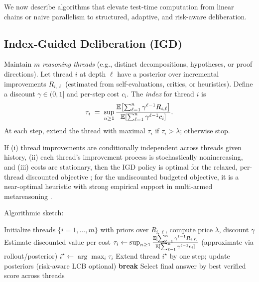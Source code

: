 We now describe algorithms that elevate test-time computation from linear chains or naive parallelism to structured, adaptive, and risk-aware deliberation.

\subsection{Index-Guided Deliberation (IGD)}

Maintain $m$ \emph{reasoning threads} (e.g., distinct decompositions, hypotheses, or proof directions). Let thread $i$ at depth $\ell$ have a posterior over incremental improvements $R_{i,\ell}$ (estimated from self-evaluations, critics, or heuristics). Define a discount $\gamma \in (0,1]$ and per-step cost $c_i$.
The \emph{index} for thread $i$ is
\begin{equation}
\tau_i \;=\; \sup_{n \ge 1} \frac{\mathbb{E}\!\left[ \sum_{\ell=1}^n \gamma^{\ell-1} R_{i,\ell} \right]}{\mathbb{E}\!\left[ \sum_{\ell=1}^n \gamma^{\ell-1} c_i \right]}.
\label{eq:gittins}
\end{equation}
At each step, extend the thread with maximal $\tau_i$ if $\tau_i > \lambda$; otherwise stop. 

\begin{proposition}
If (i) thread improvements are conditionally independent across threads given history, (ii) each thread's improvement process is stochastically nonincreasing, and (iii) costs are stationary, then the IGD policy is optimal for the relaxed, per-thread discounted objective \cite{gittins1979,whittle1988restless}; for the undiscounted budgeted objective, it is a near-optimal heuristic with strong empirical support in multi-armed metareasoning \cite{russellwefald1991,liedergriffiths2020}.
\end{proposition}

\noindent
Algorithmic sketch:

\begin{algorithm}[h]
\caption{Index-Guided Deliberation (IGD)}
\label{alg:igd}
\begin{algorithmic}[1]
\STATE Initialize threads $\{i=1,\dots,m\}$ with priors over $R_{i,\ell}$, compute price $\lambda$, discount $\gamma$
\REPEAT
        \STATE Estimate discounted value per cost $\tau_i \leftarrow \sup_{n\ge 1} \frac{\mathbb{E}[\sum_{\ell=1}^{n}\gamma^{\ell-1} R_{i,\ell}]}{\mathbb{E}[\sum_{\ell=1}^{n}\gamma^{\ell-1} c_i]}$ (approximate via rollout/posterior)
    \ENDFOR
    \STATE $i^\star \leftarrow \arg\max_i \tau_i$
        \STATE Extend thread $i^\star$ by one step; update posteriors (risk-aware LCB optional)
    \ELSE
        \STATE \textbf{break} 
    \ENDIF
{}
\STATE Select final answer by best verified score across threads
\end{algorithmic}
\end{algorithm}

